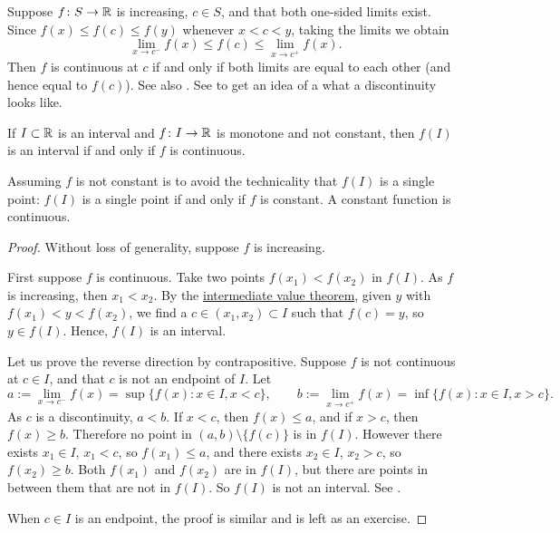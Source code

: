 Suppose $f \colon S \to {\mathbb{R}}$ is increasing, $c \in S$, and
that both one-sided limits exist.
Since $f(x) \leq f(c) \leq f(y)$
whenever $x < c < y$, taking the limits we obtain
\begin{equation*}
\lim_{x \to c^-} f(x) \leq f(c) \leq \lim_{x \to c^+} f(x) .
\end{equation*}
Then $f$ is continuous at $c$ if and only if both limits are equal
to each other (and hence equal to $f(c)$).  See also
.
See  to get an idea of a what a discontinuity
looks like.


\begin{cor} \label{cor:continterval}
If $I \subset {\mathbb{R}}$ is an interval and $f \colon I \to {\mathbb{R}}$ is 
monotone and not constant, then $f(I)$ is an interval if and only if $f$
is continuous.
\end{cor}

Assuming $f$ is not constant is to avoid the technicality
that $f(I)$ is a single point: $f(I)$ is a single
point if and only if $f$ is constant.  A constant function is 
continuous.

\begin{proof}
Without loss of generality, suppose $f$ is increasing.

First suppose $f$ is continuous.  Take two points
$f(x_1) < f(x_2)$ in $f(I)$.
As $f$ is increasing, then $x_1 < x_2$.  By the
\hyperref[IVT:thm]{intermediate value theorem},
given $y$ with $f(x_1) < y < f(x_2)$, we find
a $c \in (x_1,x_2) \subset I$ such that $f(c) = y$, so $y \in f(I)$. 
Hence, $f(I)$ is an interval.

Let us prove the reverse direction by contrapositive.
Suppose $f$ is not continuous at $c \in I$,
and that $c$ is not an endpoint of $I$.
Let
\begin{equation*}
a := \lim_{x \to c^-} f(x) = \sup \bigl\{ f(x) : x \in I, x < c \bigr\} ,
\qquad
b := \lim_{x \to c^+} f(x) = \inf \bigl\{ f(x) : x \in I, x > c \bigr\} .
\end{equation*}
As $c$ is a discontinuity, $a < b$.
If $x < c$, then $f(x) \leq a$, and
if $x > c$, then $f(x) \geq b$.  Therefore
no point
in $(a,b) \setminus \bigl\{ f(c) \bigr\}$ is in $f(I)$.
However there exists $x_1 \in I$, $x_1 < c$, so
$f(x_1) \leq a$, and there exists $x_2 \in I$, $x_2 > c$,
so $f(x_2) \geq b$.  Both $f(x_1)$ and $f(x_2)$ are in $f(I)$,
but there are points in between them that are not in $f(I)$.
So $f(I)$ is not an interval.  See .

When $c \in I$ is an endpoint, the proof is similar and is left as an exercise.
\end{proof}

